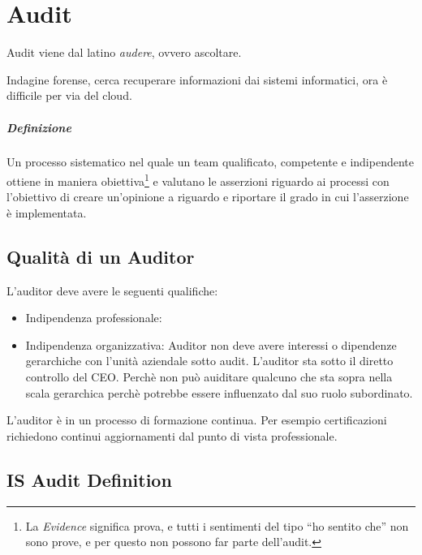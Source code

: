 
\chapter{Audit}

Audit viene dal latino \textit{audere}, ovvero ascoltare.


Indagine forense, cerca recuperare informazioni dai sistemi informatici, ora è 
difficile per via del cloud.





\paragraph*{Definizione}

Un processo sistematico nel quale un team qualificato, competente e indipendente 
ottiene in maniera obiettiva\footnote{La \textit{Evidence} significa prova, e 
tutti i sentimenti del tipo ``ho sentito che'' non sono prove, e per questo non 
possono far parte dell'audit.} e valutano le asserzioni riguardo ai processi con 
l'obiettivo di creare un'opinione a riguardo e riportare il grado in cui 
l'asserzione è implementata.


\section{Qualità di un Auditor}

L'auditor deve avere le seguenti qualifiche:
\begin{itemize}
\item Indipendenza professionale: 
\item Indipendenza organizzativa: 
Auditor non deve avere interessi o dipendenze gerarchiche con l'unità aziendale 
sotto audit. L'auditor sta sotto il diretto controllo del CEO. Perchè non può 
auiditare qualcuno che sta sopra nella scala gerarchica perchè potrebbe essere 
influenzato dal suo ruolo subordinato.
\end{itemize}


L'auditor è in un processo di formazione continua. Per esempio certificazioni 
richiedono continui aggiornamenti dal punto di vista professionale.







\section{IS Audit Definition}

